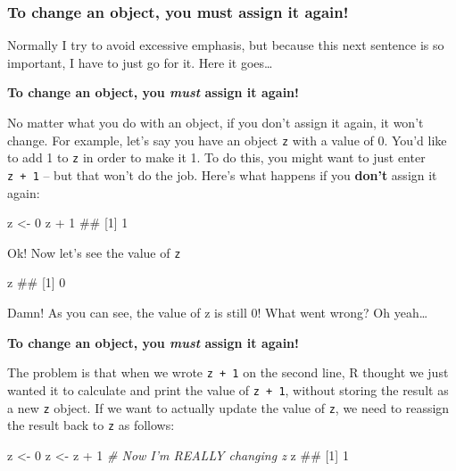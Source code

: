 \documentclass[]{book}
\newenvironment{Shaded}{\begin{snugshade}}{\end{snugshade}}
\newcommand{\DecValTok}[1]{\textcolor[rgb]{0.00,0.00,0.81}{{#1}}}
\newcommand{\StringTok}[1]{\textcolor[rgb]{0.31,0.60,0.02}{{#1}}}
\newcommand{\CommentTok}[1]{\textcolor[rgb]{0.56,0.35,0.01}{\textit{{#1}}}}
\newcommand{\NormalTok}[1]{{#1}}
\theoremstyle{definition}
\theoremstyle{definition}
\theoremstyle{remark}
\begin{document}
\subsubsection{To change an object, you must assign it
again!}\label{to-change-an-object-you-must-assign-it-again}

Normally I try to avoid excessive emphasis, but because this next
sentence is so important, I have to just go for it. Here it goes\ldots{}

\textbf{To change an object, you \textit{must} assign it again!}

No matter what you do with an object, if you don't assign it again, it
won't change. For example, let's say you have an object \texttt{z} with
a value of 0. You'd like to add 1 to \texttt{z} in order to make it 1.
To do this, you might want to just enter \texttt{z\ +\ 1} -- but that
won't do the job. Here's what happens if you \textbf{don't} assign it
again:

\begin{Shaded}
\begin{Highlighting}[]
\NormalTok{z <-}\StringTok{ }\DecValTok{0}
\NormalTok{z +}\StringTok{ }\DecValTok{1}
\NormalTok{## [1] 1}
\end{Highlighting}
\end{Shaded}

Ok! Now let's see the value of \texttt{z}

\begin{Shaded}
\begin{Highlighting}[]
\NormalTok{z}
\NormalTok{## [1] 0}
\end{Highlighting}
\end{Shaded}

Damn! As you can see, the value of z is still 0! What went wrong? Oh
yeah\ldots{}

\textbf{To change an object, you \emph{must} assign it again!}

The problem is that when we wrote \texttt{z\ +\ 1} on the second line, R
thought we just wanted it to calculate and print the value of
\texttt{z\ +\ 1}, without storing the result as a new \texttt{z} object.
If we want to actually update the value of \texttt{z}, we need to
reassign the result back to \texttt{z} as follows:

\begin{Shaded}
\begin{Highlighting}[]
\NormalTok{z <-}\StringTok{ }\DecValTok{0}
\NormalTok{z <-}\StringTok{ }\NormalTok{z +}\StringTok{ }\DecValTok{1}  \CommentTok{# Now I'm REALLY changing z}
\NormalTok{z}
\NormalTok{## [1] 1}
\end{Highlighting}
\end{Shaded}
\end{document}
